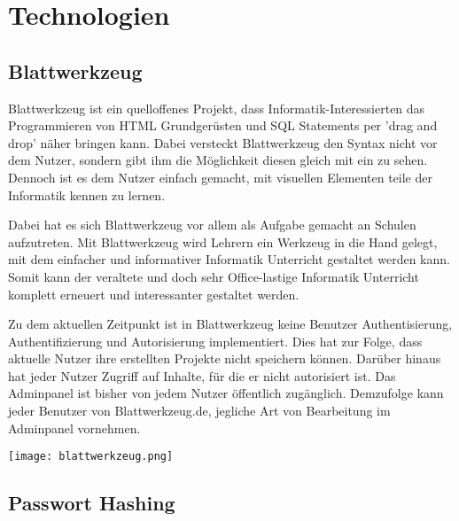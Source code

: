 \documentclass[11pt]{article}
\begin{document}
	\section{Technologien}
	\label{sec:technology}

		\subsection{Blattwerkzeug}
		\label{sec:blattwerkzeug}

		\begin{flushleft}
			Blattwerkzeug ist ein quelloffenes Projekt, dass Informatik-Interessierten das Programmieren von HTML Grundgerüsten und SQL Statements per 'drag and drop' näher bringen kann. Dabei versteckt Blattwerkzeug den Syntax nicht vor dem Nutzer, sondern gibt ihm die Möglichkeit diesen gleich mit ein zu sehen. Dennoch ist es dem Nutzer einfach gemacht, mit visuellen Elementen teile der Informatik kennen zu lernen.\par\bigskip

			Dabei hat es sich Blattwerkzeug vor allem als Aufgabe gemacht an Schulen aufzutreten. Mit Blattwerkzeug wird Lehrern ein Werkzeug in die Hand gelegt, mit dem einfacher und informativer Informatik Unterricht gestaltet werden kann. Somit kann der veraltete und doch sehr Office-lastige Informatik Unterricht komplett erneuert und interessanter gestaltet werden.\par\bigskip

			Zu dem aktuellen Zeitpunkt ist in Blattwerkzeug keine Benutzer Authentisierung, Authentifizierung und Autorisierung implementiert. Dies hat zur Folge, dass aktuelle Nutzer ihre erstellten Projekte nicht speichern können. Darüber hinaus hat jeder Nutzer Zugriff auf Inhalte, für die er nicht autorisiert ist. Das Adminpanel ist bisher von jedem Nutzer öffentlich zugänglich. Demzufolge kann jeder Benutzer von Blattwerkzeug.de, jegliche Art von Bearbeitung im Adminpanel vornehmen.
		\end{flushleft}

		\begin{center}
			\texttt{[image: blattwerkzeug.png]}
                \end{center}


		\subsection{Passwort Hashing}
		\label{sec:password_hashing}
\end{document}
